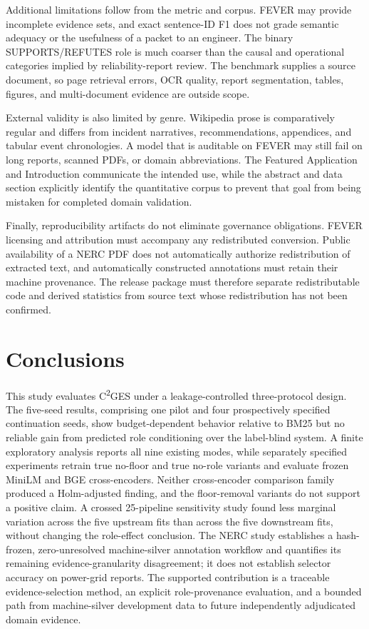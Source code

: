 \documentclass[applsci,article,submit,moreauthors]{Definitions/mdpi}
\newcommand{\cges}{C\textsuperscript{2}GES}
\begin{document}
Additional limitations follow from the metric and corpus. FEVER may provide incomplete evidence sets, and exact sentence-ID F1 does not grade semantic adequacy or the usefulness of a packet to an engineer. The binary SUPPORTS/REFUTES role is much coarser than the causal and operational categories implied by reliability-report review. The benchmark supplies a source document, so page retrieval errors, OCR quality, report segmentation, tables, figures, and multi-document evidence are outside scope.

External validity is also limited by genre. Wikipedia prose is comparatively regular and differs from incident narratives, recommendations, appendices, and tabular event chronologies. A model that is auditable on FEVER may still fail on long reports, scanned PDFs, or domain abbreviations. The Featured Application and Introduction communicate the intended use, while the abstract and data section explicitly identify the quantitative corpus to prevent that goal from being mistaken for completed domain validation.

Finally, reproducibility artifacts do not eliminate governance obligations. FEVER licensing and attribution must accompany any redistributed conversion. Public availability of a NERC PDF does not automatically authorize redistribution of extracted text, and automatically constructed annotations must retain their machine provenance. The release package must therefore separate redistributable code and derived statistics from source text whose redistribution has not been confirmed.

\section{Conclusions}
This study evaluates \cges{} under a leakage-controlled three-protocol design. The five-seed results, comprising one pilot and four prospectively specified continuation seeds, show budget-dependent behavior relative to BM25 but no reliable gain from predicted role conditioning over the label-blind system. A finite exploratory analysis reports all nine existing modes, while separately specified experiments retrain true no-floor and true no-role variants and evaluate frozen MiniLM and BGE cross-encoders. Neither cross-encoder comparison family produced a Holm-adjusted finding, and the floor-removal variants do not support a positive claim. A crossed 25-pipeline sensitivity study found less marginal variation across the five upstream fits than across the five downstream fits, without changing the role-effect conclusion. The NERC study establishes a hash-frozen, zero-unresolved machine-silver annotation workflow and quantifies its remaining evidence-granularity disagreement; it does not establish selector accuracy on power-grid reports. The supported contribution is a traceable evidence-selection method, an explicit role-provenance evaluation, and a bounded path from machine-silver development data to future independently adjudicated domain evidence.
\end{document}

